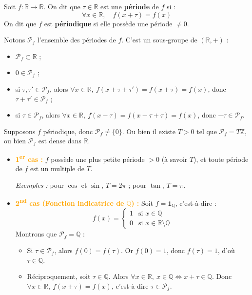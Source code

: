 \documentclass[a4paper,11pt]{article}
\newcommand{\R}{\mathbb{R}}
\newcommand{\Z}{\mathbb{Z}}
\newcommand{\Q}{\mathbb{Q}}
\newcommand{\mot}[1]{\textcolor{bordeaux}{\textbf{#1}}}
\newcommand{\cas}[1]{\textbf{\textcolor{orange}{#1}}}
\begin{document}
\begin{exemples}
Soit $f : \R \to \R$. On dit que $\tau \in \R$ est une \mot{période} de $f$ si :
\[
\forall x \in \R, \quad f(x + \tau) = f(x)
\]
On dit que $f$ est \mot{périodique} si elle possède une période $\neq 0$.

Notons $\mathcal{P}_f$ l'ensemble des périodes de $f$. C'est un sous-groupe de $(\R, +)$ :
\begin{itemize}
    \item $\mathcal{P}_f \subset \R$ ;
    \item $0 \in \mathcal{P}_f$ ;
    \item si $\tau, \tau' \in \mathcal{P}_f$, alors $\forall x \in \R, \ f(x + \tau + \tau') = f(x + \tau) = f(x)$, donc $\tau + \tau' \in \mathcal{P}_f$ ;
    \item si $\tau \in \mathcal{P}_f$, alors $\forall x \in \R, \ f(x - \tau) = f(x - \tau + \tau) = f(x)$, donc $-\tau \in \mathcal{P}_f$.
\end{itemize}

Supposons $f$ périodique, donc $\mathcal{P}_f \neq \{0\}$. Ou bien il existe $T > 0$ tel que $\mathcal{P}_f = T\Z$, ou bien $\mathcal{P}_f$ est dense dans $\R$.

\begin{itemize}
    \item \cas{1\textsuperscript{er} cas :} $f$ possède une plus petite période $> 0$ (à savoir $T$), et toute période de $f$ est un multiple de $T$.
    
    \textit{Exemples :} pour $\cos$ et $\sin$, $T = 2\pi$ ; pour $\tan$, $T = \pi$.

    \item \cas{2\textsuperscript{nd} cas (Fonction indicatrice de $\Q$) :} Soit $f = \mathbf{1}_\Q$, c'est-à-dire :
    \[
    f(x) = \begin{cases} 1 & \text{si } x \in \Q \\ 0 & \text{si } x \in \R \setminus \Q \end{cases}
    \]
    Montrons que $\mathcal{P}_f = \Q$ :
    \begin{itemize}
        \item Si $\tau \in \mathcal{P}_f$, alors $f(0) = f(\tau)$. Or $f(0) = 1$, donc $f(\tau) = 1$, d'où $\tau \in \Q$.
        \item Réciproquement, soit $\tau \in \Q$. Alors $\forall x \in \R, \ x \in \Q \iff x + \tau \in \Q$. Donc $\forall x \in \R, \ f(x + \tau) = f(x)$, c'est-à-dire $\tau \in \mathcal{P}_f$.
    \end{itemize}
\end{itemize}


\end{exemples}
\end{document}
